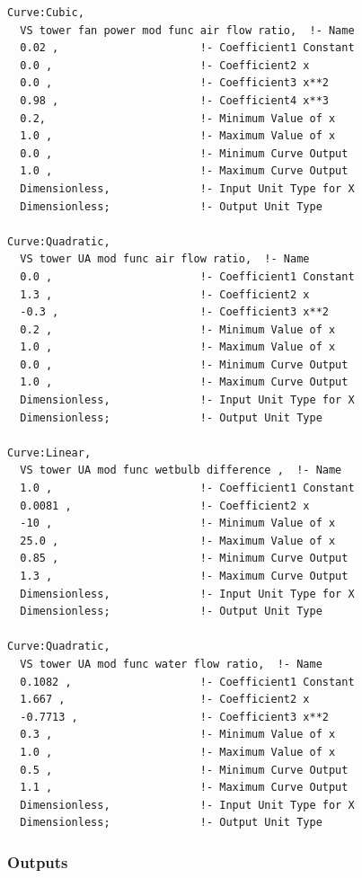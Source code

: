 \begin{lstlisting}
Curve:Cubic,
  VS tower fan power mod func air flow ratio,  !- Name
  0.02 ,                      !- Coefficient1 Constant
  0.0 ,                       !- Coefficient2 x
  0.0 ,                       !- Coefficient3 x**2
  0.98 ,                      !- Coefficient4 x**3
  0.2,                        !- Minimum Value of x
  1.0 ,                       !- Maximum Value of x
  0.0 ,                       !- Minimum Curve Output
  1.0 ,                       !- Maximum Curve Output
  Dimensionless,              !- Input Unit Type for X
  Dimensionless;              !- Output Unit Type

Curve:Quadratic,
  VS tower UA mod func air flow ratio,  !- Name
  0.0 ,                       !- Coefficient1 Constant
  1.3 ,                       !- Coefficient2 x
  -0.3 ,                      !- Coefficient3 x**2
  0.2 ,                       !- Minimum Value of x
  1.0 ,                       !- Maximum Value of x
  0.0 ,                       !- Minimum Curve Output
  1.0 ,                       !- Maximum Curve Output
  Dimensionless,              !- Input Unit Type for X
  Dimensionless;              !- Output Unit Type

Curve:Linear,
  VS tower UA mod func wetbulb difference ,  !- Name
  1.0 ,                       !- Coefficient1 Constant
  0.0081 ,                    !- Coefficient2 x
  -10 ,                       !- Minimum Value of x
  25.0 ,                      !- Maximum Value of x
  0.85 ,                      !- Minimum Curve Output
  1.3 ,                       !- Maximum Curve Output
  Dimensionless,              !- Input Unit Type for X
  Dimensionless;              !- Output Unit Type

Curve:Quadratic,
  VS tower UA mod func water flow ratio,  !- Name
  0.1082 ,                    !- Coefficient1 Constant
  1.667 ,                     !- Coefficient2 x
  -0.7713 ,                   !- Coefficient3 x**2
  0.3 ,                       !- Minimum Value of x
  1.0 ,                       !- Maximum Value of x
  0.5 ,                       !- Minimum Curve Output
  1.1 ,                       !- Maximum Curve Output
  Dimensionless,              !- Input Unit Type for X
  Dimensionless;              !- Output Unit Type
\end{lstlisting}

\subsubsection{Outputs}\label{outputs-2-003}

